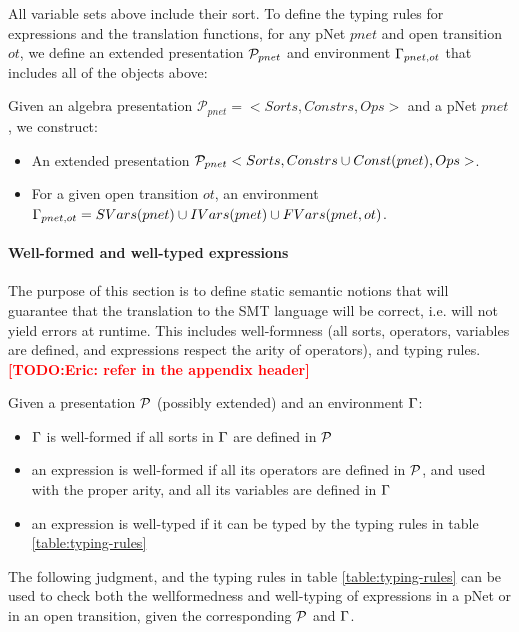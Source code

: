 \documentclass{lncs/llncs}
\newcommand{\TODO}[1]{\textcolor{red}{\textbf{[TODO:#1]}}}
\begin{document}
All variable sets above include their sort.
To define the typing rules for expressions and the translation
functions, for any pNet $pnet$ and open transition $ot$, we define an
extended presentation $\mathcal{P}_{pnet}$ and environment $\Gamma_{pnet,ot}$ that includes all of the
objects above:

\begin{definition}
  Given an algebra presentation $\mathcal{P}_{pnet}=<Sorts,Constrs,Ops>$ and a pNet $pnet$, we
  construct:
  \begin{itemize}
  \item An extended presentation $\mathcal{P}_{pnet}<Sorts,Constrs \cup Const(pnet),Ops>$.
  \item For a given open transition $ot$, an environment
    $\Gamma_{pnet,ot}=SVars(pnet) \cup IVars(pnet) \cup FVars(pnet,ot)$. 
  \end{itemize} 
\end{definition}



\paragraph{Well-formed and well-typed expressions}

The purpose of this section is to define static semantic notions that
will guarantee that the translation to the SMT language will be
correct, i.e. will not yield errors at runtime. This includes
well-formness (all sorts, operators, variables are defined, and
expressions respect the arity of operators), and typing rules.
\TODO{Eric: refer in the appendix header}

\begin{definition}
  Given a presentation $\mathcal{P}$ (possibly extended) and an environment $\Gamma$:
  \begin{itemize}
  \item $\Gamma$ is well-formed if all sorts in $\Gamma$ are
    defined in $\mathcal{P}$
  \item an expression is well-formed if all its operators are defined
    in $\mathcal{P}$, and used with the proper arity, and all its
    variables are defined in $\Gamma$
  \item an expression is well-typed if it can be typed by the typing
    rules in table \ref{table:typing-rules}
  \end{itemize}
\end{definition}

The following judgment, and the typing rules in table
\ref{table:typing-rules} can be used to check both the wellformedness
and well-typing of expressions in a pNet or in an open transition,
given the corresponding $\mathcal{P}$ and $\Gamma$.
\end{document}
